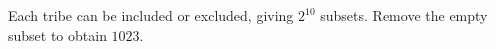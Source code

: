 Each tribe can be included or excluded, giving $2^{10}$ subsets. Remove the empty subset to obtain $\boxed{1023}$.
